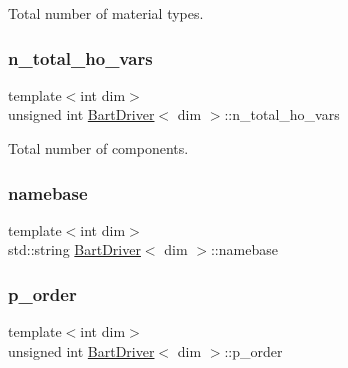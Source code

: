 Total number of material types. 

\mbox{\label{class_bart_driver_ab290f0bd63869bf124163f68e1be1a6a}} 
\subsubsection{\texorpdfstring{n\+\_\+total\+\_\+ho\+\_\+vars}{n\_total\_ho\_vars}}
{\footnotesize\ttfamily template$<$int dim$>$ \\
unsigned int \hyperlink{class_bart_driver}{Bart\+Driver}$<$ dim $>$\+::n\+\_\+total\+\_\+ho\+\_\+vars\hspace{0.3cm}{\ttfamily [private]}}



Total number of components. 

\mbox{\label{class_bart_driver_a34229e58237aaac1551db7a3ec140e1c}} 
\subsubsection{\texorpdfstring{namebase}{namebase}}
{\footnotesize\ttfamily template$<$int dim$>$ \\
std\+::string \hyperlink{class_bart_driver}{Bart\+Driver}$<$ dim $>$\+::namebase\hspace{0.3cm}{\ttfamily [private]}}

\mbox{\label{class_bart_driver_ae6d782d30c28d741bb0df46251087809}} 
\subsubsection{\texorpdfstring{p\+\_\+order}{p\_order}}
{\footnotesize\ttfamily template$<$int dim$>$ \\
unsigned int \hyperlink{class_bart_driver}{Bart\+Driver}$<$ dim $>$\+::p\+\_\+order\hspace{0.3cm}{\ttfamily [private]}}



